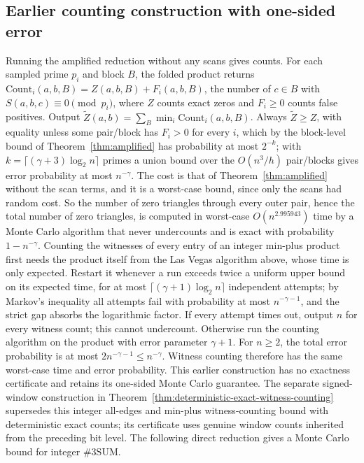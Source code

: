 \documentclass[11pt]{article}
\begin{document}
\subsection*{Earlier counting construction with one-sided error}
Running the amplified reduction without any scans gives counts. For each
sampled prime $p_i$ and block $B$, the folded product returns
$\mathrm{Count}_i(a,b,B)=Z(a,b,B)+F_i(a,b,B)$, the number of $c\in B$ with
$S(a,b,c)\equiv0\pmod{p_i}$, where $Z$ counts exact zeros and $F_i\ge0$
counts false positives. Output $\widetilde Z(a,b)=\sum_B\min_i\mathrm{Count}_i(a,b,B)$.
Always $\widetilde Z\ge Z$, with equality unless some pair/block has
$F_i>0$ for every $i$, which by the block-level bound of
Theorem~\ref{thm:amplified} has probability at most $2^{-k}$; with
$k=\lceil(\gamma+3)\log_2n\rceil$ primes a union bound over the
$O(n^3/h)$ pair/blocks gives error probability at most $n^{-\gamma}$. The
cost is that of Theorem~\ref{thm:amplified} without the scan terms, and it
is a worst-case bound, since only the scans had random cost. So the number
of zero triangles through every outer pair, hence the total number of zero
triangles, is computed in worst-case $O(n^{2.995943})$ time by a Monte Carlo
algorithm that never undercounts and is exact with probability
$1-n^{-\gamma}$. Counting the witnesses of every entry of an integer
min-plus product first needs the product itself from the Las Vegas
algorithm above, whose time is only expected. Restart it whenever a run
exceeds twice a uniform upper bound on its expected time, for at most
$\lceil(\gamma+1)\log_2n\rceil$ independent attempts;
by Markov's inequality all attempts fail with probability at most
$n^{-\gamma-1}$, and the strict gap absorbs the logarithmic factor.
If every attempt times out, output $n$ for every witness count; this cannot
undercount. Otherwise run the counting algorithm on the product with error
parameter $\gamma+1$. For $n\ge2$, the total error probability is at most
$2n^{-\gamma-1}\le n^{-\gamma}$. Witness counting therefore has the
same worst-case time and error probability. This earlier construction has
no exactness certificate and retains its one-sided Monte Carlo guarantee.
The separate signed-window construction in
Theorem~\ref{thm:deterministic-exact-witness-counting} supersedes this
integer all-edges and min-plus witness-counting bound with deterministic
exact counts; its certificate uses genuine window counts inherited from
the preceding bit level.
The following direct reduction gives a Monte Carlo bound for integer
$\#3\mathrm{SUM}$.
\end{document}

